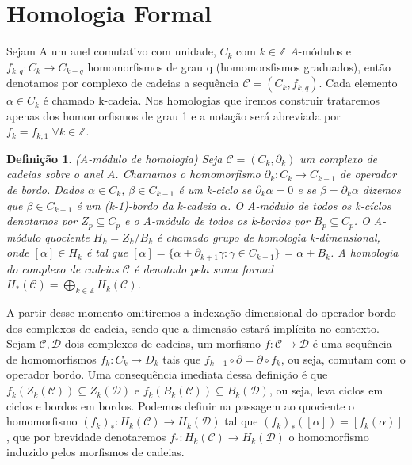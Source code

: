 \documentclass[12pt]{book}
\newtheorem{definicao}[teorema]{Definição}
\newcommand{\inteiros}{\mathbb{Z}}
\begin{document}
	\section{Homologia Formal}
	Sejam A um anel comutativo com unidade, $C_{k}$ com $k \in \inteiros$ $A$-módulos e $f_{k,q}: C_{k} \to C_{k-q} $ homomorfismos de grau q (homomorsfismos graduados), então denotamos por complexo de cadeias a sequência $\mathcal{C} = (C_{k}, f_{k,q})$. Cada elemento $\alpha \in C_{k}$ é chamado k-cadeia. Nos homologias que iremos construir trataremos apenas dos homomorfismos de grau 1 e a notação será abreviada por $f_{k} = f_{k,1} \; \forall k \in \inteiros$.
	
	\begin{definicao}
		(A-módulo de homologia) Seja $\mathcal{C} = (C_{k}, \partial_{k})$ um complexo de cadeias sobre o anel $A$. Chamamos o homomorfismo $\partial_{k}: C_{k} \to C_{k-1} $ de operador de bordo. Dados $\alpha \in C_{k}$, $\beta \in C_{k-1}$  é um k-ciclo se $\partial_{k }\alpha=0$ e se $\beta =  \partial_{k }\alpha$ dizemos que $\beta \in C_{k-1}$ é um (k-1)-bordo da k-cadeia $\alpha$. O A-módulo de todos os k-cíclos denotamos por $Z_{p} \subseteq C_{p}$ e o  A-módulo de todos os k-bordos por $B_{p} \subseteq C_{p}$. O A-módulo quociente $H_{k} = Z_{k} / B_{k}$ é chamado grupo de homologia k-dimensional, onde $[\alpha] \in H_{k}$ é tal que $[\alpha] = \{\alpha+\partial_{k+1}\gamma :\gamma \in  C_{k+1}\}$ = $\alpha + B_{k}$. A homologia do complexo de cadeias $\mathcal{C}$ é denotado pela soma formal $H_{*}(\mathcal{C}) = \bigoplus_{k \in \inteiros} H_{k}(\mathcal{C})$.
	\end{definicao}
	
	A partir desse momento omitiremos a indexação dimensional do operador bordo dos complexos de cadeia, sendo que a dimensão estará implícita no contexto. Sejam $\mathcal{C}, \mathcal{D}$ dois complexos de cadeias, um morfismo $f: \mathcal{C} \to \mathcal{D}$ é uma sequência de homomorfismos $f_{k}: C_{k} \to D_{k}$ tais que $f_{k-1}\circ\partial = \partial\circ f_{k}$, ou seja, comutam com o operador bordo. Uma consequência imediata dessa definição é que $f_{k}(Z_{k}(\mathcal{C})) \subseteq Z_{k}(\mathcal{D})$ e $f_{k}(B_{k}(\mathcal{C})) \subseteq B_{k}(\mathcal{D})$, ou seja, leva ciclos em ciclos e bordos em bordos. Podemos definir na passagem ao quociente o homomorfismo $(f_{k})_{*}:H_{k}(\mathcal{C}) \to H_{k}(\mathcal{D})$ tal que $(f_{k})_{*}([\alpha]) = [f_{k}(\alpha)]$, que por brevidade denotaremos $f_{*}:H_{k}(\mathcal{C}) \to H_{k}(\mathcal{D})$ o homomorfismo induzido pelos morfismos de cadeias.
	
\end{document}
